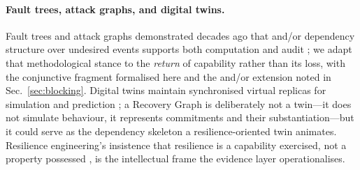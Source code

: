 \paragraph{Fault trees, attack graphs, and digital twins.}
Fault trees and attack graphs demonstrated decades ago that and/or dependency structure over undesired events supports both computation and audit \citep{vesely1981fault,sheyner2002attack}; we adapt that methodological stance to the \emph{return} of capability rather than its loss, with the conjunctive fragment formalised here and the and/or extension noted in Sec.~\ref{sec:blocking}. Digital twins maintain synchronised virtual replicas for simulation and prediction \citep{tao2019digitaltwin,jones2020digitaltwin}; a Recovery Graph is deliberately not a twin---it does not simulate behaviour, it represents commitments and their substantiation---but it could serve as the dependency skeleton a resilience-oriented twin animates. Resilience engineering's insistence that resilience is a capability exercised, not a property possessed \citep{hollnagel2006resilience,woods2015four}, is the intellectual frame the evidence layer operationalises.
